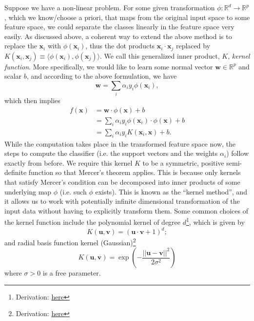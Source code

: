 \documentclass[12pt]{article}
\theoremstyle{definition}
\begin{document}
Suppose we have a non-linear problem. For some given transformation $\phi:\mathbb{R}^d\to\mathbb{R}^p$, which we know/choose a priori, that maps from the original input space to some feature space, we could separate the classes linearly in the feature space very easily. As discussed above, a coherent way to extend the above method is to replace the $\mathbf{x}_i$ with $\phi(\mathbf{x}_i)$, thus the dot products $\mathbf{x}_i\cdot\mathbf{x}_j$ replaced by $K(\mathbf{x}_i,\mathbf{x}_j)\equiv\langle\phi(\mathbf{x}_i),\phi(\mathbf{x}_j)\rangle$. We call this generalized inner product, $K$, \textit{kernel function}. More specifically, we would like to learn some normal vector $\mathbf{w}\in\mathbb{R}^p$ and scalar $b$, and according to the above formulation, we have 
\begin{equation}
    \mathbf{w}=\sum_i \alpha_i y_i\phi(\mathbf{x}_i),
\end{equation}
which then implies
\begin{equation}
\begin{aligned}
    f(\mathbf{x})&=\mathbf{w}\cdot\phi(\mathbf{x})+b \\
    &=\sum_i \alpha_i y_i \phi(\mathbf{x}_i)\cdot\phi(\mathbf{x})+b \\
    &=\sum_i \alpha_i y_i K(\mathbf{x}_i,\mathbf{x})+b.
\end{aligned}
\end{equation}
While the computation takes place in the transformed feature space now, the steps to compute the classifier (i.e. the support vectors and the weights $\alpha_i$) follow exactly from before. We require this kernel $K$ to be a symmetric, positive semi-definite function so that Mercer's theorem applies. This is because only kernels that satisfy Mercer's condition can be decomposed into inner products of some underlying map $\phi$ (i.e. such $\phi$ exists). This is known as the ``kernel method'', and it allows us to work with potentially infinite dimensional transformation of the input data without having to explicitly transform them. Some common choices of the kernel function include the polynomial kernel of degree $d$\footnote{Derivation: \href{https://en.wikipedia.org/wiki/Polynomial_kernel}{here}}, which is given by 
\begin{equation}
    K(\mathbf{u},\mathbf{v})=(\mathbf{u}\cdot\mathbf{v}+1)^d;
\end{equation}
and radial basis function kernel (Gaussian)\footnote{Derivation: \href{https://en.wikipedia.org/wiki/Radial_basis_function_kernel}{here}}
\begin{equation}
    K(\mathbf{u},\mathbf{v})=\exp\left(-\frac{||\mathbf{u}-\mathbf{v}||^2}{2\sigma^2}\right)
\end{equation}
where $\sigma>0$ is a free parameter.
\end{document}
